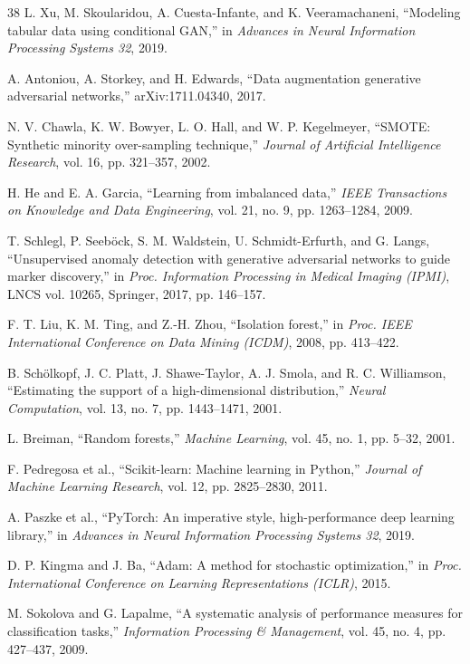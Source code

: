 \documentclass[conference]{IEEEtran}
\begin{document}
\begin{thebibliography}{38}
L. Xu, M. Skoularidou, A. Cuesta-Infante, and K. Veeramachaneni,
``Modeling tabular data using conditional GAN,''
in \textit{Advances in Neural Information Processing Systems 32}, 2019.

A. Antoniou, A. Storkey, and H. Edwards,
``Data augmentation generative adversarial networks,''
arXiv:1711.04340, 2017.

N. V. Chawla, K. W. Bowyer, L. O. Hall, and W. P. Kegelmeyer,
``SMOTE: Synthetic minority over-sampling technique,''
\textit{Journal of Artificial Intelligence Research}, vol. 16, pp. 321--357, 2002.

H. He and E. A. Garcia,
``Learning from imbalanced data,''
\textit{IEEE Transactions on Knowledge and Data Engineering}, vol. 21, no. 9, pp. 1263--1284, 2009.

T. Schlegl, P. Seeb\"ock, S. M. Waldstein, U. Schmidt-Erfurth, and G. Langs,
``Unsupervised anomaly detection with generative adversarial networks to guide marker discovery,''
in \textit{Proc. Information Processing in Medical Imaging (IPMI)}, LNCS vol. 10265, Springer, 2017, pp. 146--157.

F. T. Liu, K. M. Ting, and Z.-H. Zhou,
``Isolation forest,''
in \textit{Proc. IEEE International Conference on Data Mining (ICDM)}, 2008, pp. 413--422.

B. Sch\"olkopf, J. C. Platt, J. Shawe-Taylor, A. J. Smola, and R. C. Williamson,
``Estimating the support of a high-dimensional distribution,''
\textit{Neural Computation}, vol. 13, no. 7, pp. 1443--1471, 2001.

L. Breiman,
``Random forests,''
\textit{Machine Learning}, vol. 45, no. 1, pp. 5--32, 2001.

F. Pedregosa et al.,
``Scikit-learn: Machine learning in Python,''
\textit{Journal of Machine Learning Research}, vol. 12, pp. 2825--2830, 2011.

A. Paszke et al.,
``PyTorch: An imperative style, high-performance deep learning library,''
in \textit{Advances in Neural Information Processing Systems 32}, 2019.

D. P. Kingma and J. Ba,
``Adam: A method for stochastic optimization,''
in \textit{Proc. International Conference on Learning Representations (ICLR)}, 2015.

M. Sokolova and G. Lapalme,
``A systematic analysis of performance measures for classification tasks,''
\textit{Information Processing \& Management}, vol. 45, no. 4, pp. 427--437, 2009.


\end{thebibliography}
\end{document}
